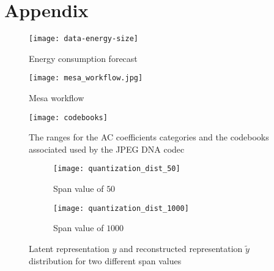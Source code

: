 
\chapter*{Appendix}

\begin{figure}[htb]
    \centering
    \texttt{[image: data-energy-size]}
    \caption{Energy consumption forecast}
    \label{fig:consumption}
\end{figure}

\begin{figure}[htb]
    \centering
    \texttt{[image: mesa\_workflow.jpg]}
    \caption{Mesa workflow}
    \label{fig:mesa_workflow}
\end{figure}

% 

\begin{figure}[htb]
    \centering
    \texttt{[image: codebooks]}
    \caption{The ranges for the AC coefficients categories and the codebooks associated used by the JPEG DNA codec}
    \label{fig:codebooks}
\end{figure}

\begin{figure}
    \begin{subfigure}{0.5\textwidth}
        \centering
        \texttt{[image: quantization\_dist\_50]}
        \caption{Span value of $50$}
        \label{fig:quantized-y-50}
    \end{subfigure}
    \begin{subfigure}{0.5\textwidth}
        \centering
        \texttt{[image: quantization\_dist\_1000]}
        \caption{Span value of $1000$}
        \label{fig:quantized-y-1000}
    \end{subfigure}
    \caption{Latent representation $y$ and reconstructed representation $\tilde{y}$ distribution for two different span values}
    \label{fig:quantized-y}
\end{figure}


